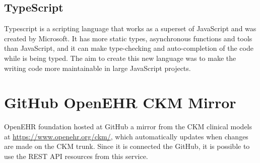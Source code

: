 \documentclass[mim_thesis.tex]{subfiles}
\begin{document}
\subsection{TypeScript}
Typescript is a scripting language that works as a superset of JavaScript and was created by Microsoft. It has more static types, asynchronous functions and tools than JavaScript, and it can make type-checking and auto-completion of the code while is being typed. The aim to create this new language was to make the writing code more maintainable in large JavaScript projects.


\section{GitHub OpenEHR CKM Mirror}
OpenEHR foundation hosted at GitHub a mirror from the CKM clinical models at \url{https://www.openehr.org/ckm/}, which automatically updates when changes are made on the CKM trunk. Since it is connected the GitHub, it is possible to use the REST API resources from this service.
\end{document}
